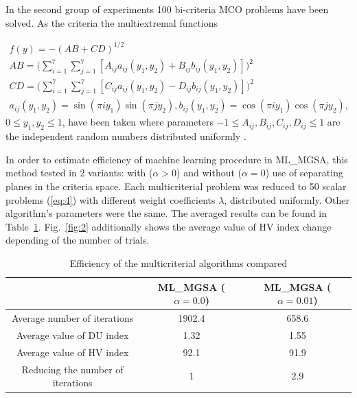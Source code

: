 \documentclass[runningheads]{llncs}
\begin{document}
In the second group of experiments 100 bi-criteria MCO problems have been solved. As the criteria the multiextremal functions

\begin{equation}
\begin{matrix}
f(y) = - (AB + CD)^{1/2} \\
AB = \Big(\sum_{i=1}^7 \sum_{j=1}^7 [A_{ij} a_{ij}(y_1, y_2) + B_{ij} b_{ij}(y_1, y_2)]\Big)^2 \\
CD = \Big(\sum_{i=1}^7 \sum_{j=1}^7 [C_{ij} a_{ij}(y_1, y_2) - D_{ij} b_{ij}(y_1, y_2)]\Big)^2 \\ 
a_{ij}(y_1, y_2) = \sin(\pi i y_1) \sin(\pi j y_2), b_{ij}(y_1, y_2) = \cos(\pi i y_1) \cos(\pi j y_2),
\end{matrix}
\end{equation}
$0 \leq y_1,y_2 \leq 1$, have been taken where parameters $-1 \leq A_{ij},B_{ij},C_{ij},D_{ij} \leq 1$ are the independent random numbers distributed uniformly \cite{Gergel2019_2,Grishagin2015_2}.

In order to estimate efficiency of machine learning procedure in ML\_MGSA, this method tested in 2 variants: with ($\alpha>0$) and without ($\alpha=0$)
use of separating planes in the criteria space. 
Each multicriterial problem was reduced to 50 scalar problems (\ref{eq:4}) with different weight coefficients $\lambda$, distributed uniformly. Other algorithm's parameters were the same. The averaged results can be found in Table~\ref{tab:2}. \textcolor[rgb]{1,0,0}{Fig.~\ref{fig:2} additionally shows the average value of HV index change depending of the number of trials.}

\begin{table}
\caption{Efficiency of the multicriterial algorithms compared}
\label{tab:2}
\begin{tabular}{ccc}
\hline
                                  & ML\_MGSA ($\alpha=0.0$) & ML\_MGSA ($\alpha=0.01$) \\ \hline
Average number of iterations      & 1902.4           & 658.6             \\
Average value of DU index        & 1.32             & 1.55              \\
Average value of HV index         & 92.1             & 91.9              \\
Reducing the number of iterations & 1                & 2.9     \\  \hline        
\end{tabular}
\end{table}
\end{document}
